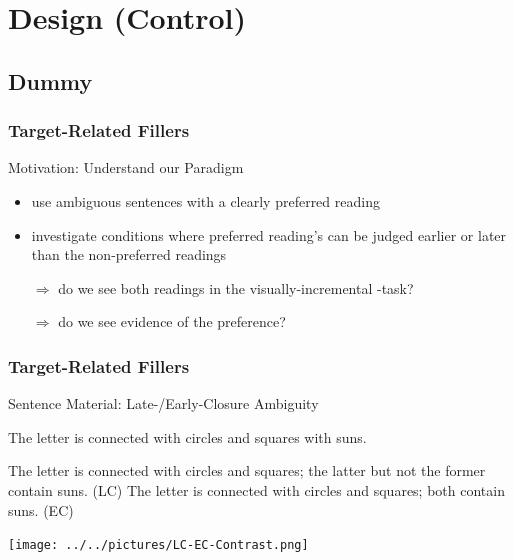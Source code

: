 \documentclass[fleqn,10pt,xcolor=dvipsnames]{beamer}
\newcommand{\LC}{LC\xspace}
\newcommand{\EC}{EC\xspace}
\begin{document}
\section{Design (Control)}
\subsection{Dummy}

\begin{frame}
  \frametitle{Target-Related Fillers}
  \begin{block}{Motivation: Understand our Paradigm}
    \begin{itemize}
    \item use ambiguous sentences with a clearly preferred reading
    \item investigate conditions where preferred reading's 
      can be judged earlier or later than the non-preferred readings 
    \item[$\Rightarrow$] do we see both readings in the visually-incremental
      -task?
    \item[$\Rightarrow$] do we see evidence of the preference?
    \end{itemize}
  \end{block}
\end{frame}

\begin{frame}
  \frametitle{Target-Related Fillers}
  \begin{block}{Sentence Material: Late-/Early-Closure Ambiguity}
    \begin{exe}
      \ex The letter is connected with circles and squares with
        suns.
        \begin{xlist}
          \ex The letter is connected with circles and squares; the latter
            but not the former contain suns. \hfill (\LC)
          \ex The letter is connected with circles and squares; both
            contain suns. \hfill (\EC)
        \end{xlist}
    \end{exe}
  \end{block}

  \begin{center}
    \texttt{[image: ../../pictures/LC-EC-Contrast.png]}
  \end{center}

\end{frame}
\end{document}

